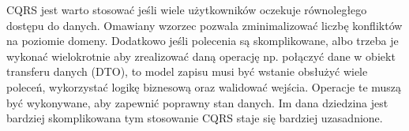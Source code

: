 CQRS jest warto stosować jeśli wiele użytkowników oczekuje równoległego dostępu do danych. Omawiany wzorzec pozwala zminimalizować liczbę konfliktów na poziomie domeny. Dodatkowo jeśli polecenia są skomplikowane, albo trzeba je wykonać wielokrotnie aby zrealizować daną operację np. połączyć dane w obiekt transferu danych (DTO), to model zapisu musi być wstanie obsłużyć wiele poleceń, wykorzystać logikę biznesową oraz walidować wejścia. Operacje te muszą być wykonywane, aby zapewnić poprawny stan danych. Im dana dziedzina jest bardziej skomplikowana tym stosowanie CQRS staje się bardziej uzasadnione.



%
%




